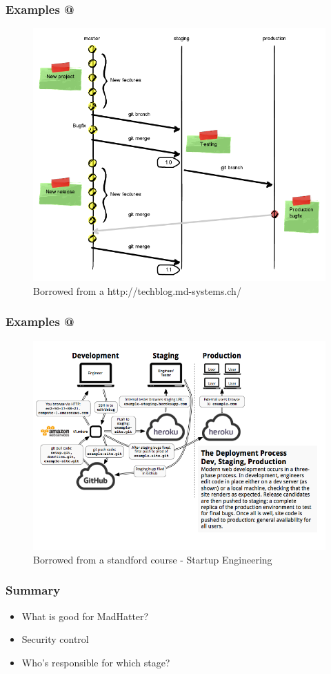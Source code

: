 \documentclass{beamer}
\makeatletter
\newcommand*{\rom}[1]{\expandafter\@slowromancap\romannumeral #1@}
\makeatother
\begin{document}
\begin{frame}
  \frametitle{Examples \rom{1}}
  \begin{figure}
  	\centering
  	\includegraphics[scale=0.30]{img/madhatter_git-workflow.png}
  	\caption{Borrowed from a http://techblog.md-systems.ch/}
  \end{figure}
\end {frame}

\begin{frame}
  \frametitle{Examples \rom{2}}
  \begin{figure}
  	\centering
  	\includegraphics[scale=0.35]{img/madhatter_1.png}
  	\caption{Borrowed from a standford course - Startup Engineering}
  \end{figure}
\end {frame}



\begin{frame}
  \frametitle{Summary}
  \begin{itemize}
  \item What is good for MadHatter?
  \item Security control
  \item Who's responsible for which stage?
  \end{itemize}
\end {frame}
\end{document}
